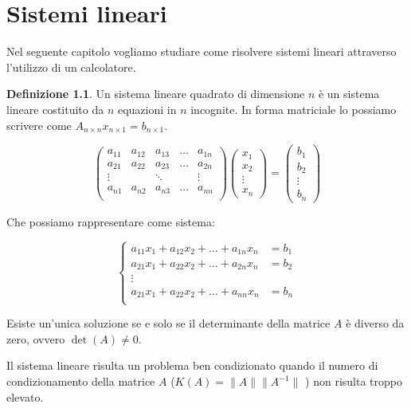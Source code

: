 \documentclass[12pt, a4paper]{book}
\theoremstyle{definition}
\newtheorem{defn}{Definizione}[section]
\begin{document}
\chapter{Sistemi lineari}
\begin{flushleft}
Nel seguente capitolo vogliamo studiare come risolvere sistemi lineari attraverso l'utilizzo di un calcolatore.
\begin{defn}
	Un sistema lineare quadrato di dimensione $n$ è un sistema lineare costituito da $n$ equazioni in $n$ incognite.  In forma matriciale lo possiamo scrivere come $A_{n \times n} x_{n \times 1} = b_{n \times 1}$.
	
	\[ 
		\begin{pmatrix}
			a_{11} & a_{12} & a_{13} & \dots & a_{1n} \\
			a_{21} & a_{22} & a_{23} & \dots & a_{2n} \\
			\vdots & & \ddots & & \vdots \\
			a_{n1} & a_{n2} & a_{n3} & \dots & a_{nn} \\
		\end{pmatrix}	
		\begin{pmatrix}
			x_{1}  \\
			x_{2}  \\
			\vdots  \\
			x_{n}
		\end{pmatrix}
		= 
		\begin{pmatrix}
			b_{1}  \\
			b_{2}  \\
			\vdots  \\
			b_{n}
		\end{pmatrix}		
	\]

Che possiamo rappresentare come sistema: 

	\[ 
			\begin{cases}
  				a_{11}x_{1} + a_{12}x_{2}  + \dots + a_{1n}x_{n} &= b_{1} \\
       			a_{21}x_{1} + a_{22}x_{2}  + \dots + a_{2n}x_{n} &= b_{2} \\
       			\vdots \\
  				a_{21}x_{1} + a_{22}x_{2}  + \dots + a_{nn}x_{n} &= b_{n} \\
			\end{cases}
	\]

Esiste un'unica soluzione se e solo se il determinante della matrice $A$ è diverso da zero, ovvero $\det(A) \neq 0$.
\end{defn}

Il sistema lineare risulta un problema ben condizionato quando il numero di condizionamento della matrice $A$ ($K(A) = \lVert A \rVert \lVert A^{-1} \rVert$ ) non risulta troppo elevato.
\end{flushleft}
\end{document}
